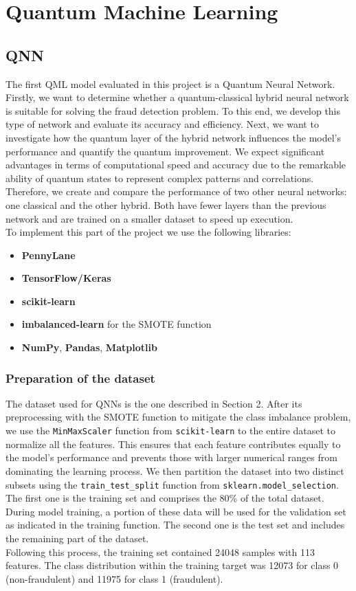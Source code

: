\documentclass[10pt]{article}
\begin{document}
\section{Quantum Machine Learning}
\subsection{QNN}
The first QML model evaluated in this project is a Quantum Neural Network.\\
Firstly, we want to determine whether a quantum-classical hybrid neural network is suitable for solving the fraud detection problem. To this end, we develop this type of network and evaluate its accuracy and efficiency.
Next, we want to investigate how the quantum layer of the hybrid network influences the model's performance and quantify the quantum improvement. We expect significant advantages in terms of computational speed and accuracy due to the remarkable ability of quantum states to represent complex patterns and correlations.
Therefore, we create and compare the performance of two other neural networks: one classical and the other hybrid. Both have fewer layers than the previous network and are trained on a smaller dataset to speed up execution.\\
To implement this part of the project we use the following libraries:
\begin{itemize}
    \item \textbf{PennyLane}
    \item \textbf{TensorFlow/Keras}
    \item \textbf{scikit-learn}
    \item \textbf{imbalanced-learn} for the SMOTE function
    \item \textbf{NumPy}, \textbf{Pandas}, \textbf{Matplotlib}
\end{itemize}

\subsubsection{Preparation of the dataset}
The dataset used for QNNs is the one described in Section 2. After its preprocessing with the SMOTE function to mitigate the class imbalance problem, we use the \texttt{MinMaxScaler} function from \texttt{scikit-learn} to the entire dataset to normalize all the features. This ensures that each feature contributes equally to the model's performance and prevents those with larger numerical ranges from dominating the learning process. 
We then partition the dataset into two distinct subsets using the \texttt{train\_test\_split} function from \texttt{sklearn.model\_selection}. The first one is the training set and comprises the 80\% of the total dataset. During model training, a portion of these data will be used for the validation set as indicated in the training function. The second one is the test set and includes the remaining part of the dataset. \\
Following this process, the training set contained 24048 samples with 113 features. The class distribution within the training target was 12073 for class 0 (non-fraudulent) and 11975 for class 1 (fraudulent).
\end{document}

